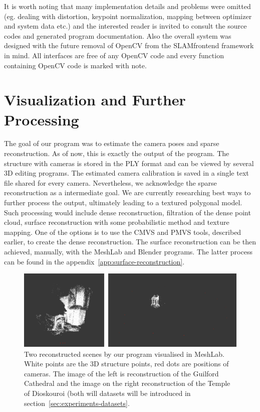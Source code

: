 It is worth noting that many implementation details and problems were omitted (eg. dealing with distortion, keypoint normalization, mapping between optimizer and system data etc.) and the interested reader is invited to consult the source codes and generated program documentation. Also the overall system was designed with the future removal of OpenCV from the SLAM\textunderscore frontend framework in mind. All interfaces are free of any OpenCV code and every function containing OpenCV code is marked with note.

\section{Visualization and Further Processing}
The goal of our program was to estimate the camera poses and sparse reconstruction. As of now, this is exactly the output of the program. The structure with cameras is stored in the PLY format and can be viewed by several 3D editing programs. The estimated camera calibration is saved in a single text file shared for every camera. Nevertheless, we acknowledge the sparse reconstruction as a intermediate goal. 
We are currently researching best ways to further process the output, ultimately leading to a textured polygonal model. Such processing would include dense reconstruction, filtration of the dense point cloud, surface reconstruction with some probabilistic method and texture mapping. One of the options is to use the CMVS and PMVS tools, described earlier, to create the dense reconstruction. The surface reconstruction can be then achieved, manually, with the MeshLab and Blender programs. The latter process can be found in the appendix~\ref{app:surface-reconstruction}.

\begin{figure}
	\begin{center}
		\includegraphics[keepaspectratio,width=\textwidth]{fig/visualisation.pdf}
	\end{center}
	\caption{Two reconstructed scenes by our program visualised in MeshLab. White points are the 3D structure points, red dots are positions of cameras. The image of the left is reconstruction of the Guilford Cathedral and the image on the right reconstruction of the Temple of Dioskouroi (both will datasets will be introduced in section~\ref{sec:experiments-datasets}.}
	\label{fig:visualisation}
\end{figure}

